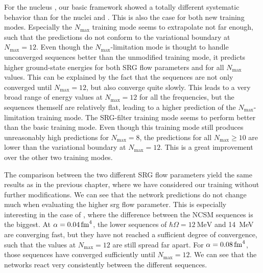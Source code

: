 For the nucleus , our basic framework showed a totally different systematic behavior than for the nuclei  and . This is also the case for both new training modes. Especially the $N_\mathrm{max}$ training mode seems to extrapolate not far enough, such that the predictions do not conform to the variational boundary at $N_\mathrm{max} = 12$. Even though the $N_\mathrm{max}$-limitation mode is thought to handle unconverged sequences better than the unmodified training mode, it predicts higher ground-state energies for both SRG flow parameters and for all $N_\mathrm{max}$ values. This can be explained by the fact that the  sequences are not only converged until $N_\mathrm{max} = 12$, but also converge quite slowly. This leads to a very broad range of energy values at $N_\mathrm{max} = 12$ for all the frequencies, but the sequences themself are relatively flat, leading to a higher prediction of the $N_\mathrm{max}$-limitation training mode. The SRG-filter training mode seems to perform better than the basic training mode. Even though this training mode still produces unreasonably high predictions for $N_\mathrm{max} = 8$, the predictions for all $N_\mathrm{max} \geq 10$ are lower than the variational boundary at $N_\mathrm{max} = 12$. This is a great improvement over the other two training modes.

The comparison between the two different SRG flow parameters yield the same results as in the previous chapter, where we have considered our training without further modifications. We can see that the network predictions do not change much when evaluating the higher srg flow parameter. This is especially interesting in the case of , where the difference between the NCSM sequences is the biggest. At $\alpha = \srg{0.04}$, the lower sequences of $\hbar \Omega = \SI{12}{\mega\electronvolt}$ and \SI{14}{\mega\electronvolt} are converging fast, but they have not reached a sufficient degree of convergence, such that the values at $N_\mathrm{max} = 12$ are still spread far apart. For $\alpha = \srg{0.08}$, those sequences have converged sufficiently until $N_\mathrm{max} = 12$. We can see that the networks react very consistently between the different sequences.



